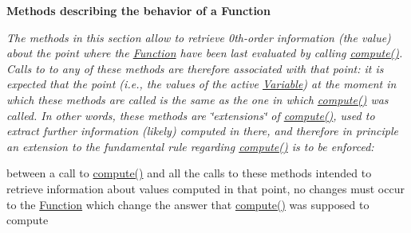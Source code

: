 \begin{Indent}\textbf{ Methods describing the behavior of a Function}\par
{\em The methods in this section allow to retrieve 0th-\/order information (the value) about the point where the \mbox{\hyperlink{class_s_m_spp__di__unipi__it_1_1_function}{Function}} have been last evaluated by calling \mbox{\hyperlink{class_s_m_spp__di__unipi__it_1_1_function_a504d4e3e174c7a518cc66156a8a45ce5}{compute()}}. Calls to to any of these methods are therefore associated with that point\+: it is expected that the point (i.\+e., the values of the active \mbox{\hyperlink{class_s_m_spp__di__unipi__it_1_1_variable}{Variable}}) at the moment in which these methods are called is the same as the one in which \mbox{\hyperlink{class_s_m_spp__di__unipi__it_1_1_function_a504d4e3e174c7a518cc66156a8a45ce5}{compute()}} was called. In other words, these methods are \char`\"{}extensions\char`\"{} of \mbox{\hyperlink{class_s_m_spp__di__unipi__it_1_1_function_a504d4e3e174c7a518cc66156a8a45ce5}{compute()}}, used to extract further information (likely) computed in there, and therefore in principle an extension to the fundamental rule regarding \mbox{\hyperlink{class_s_m_spp__di__unipi__it_1_1_function_a504d4e3e174c7a518cc66156a8a45ce5}{compute()}} is to be enforced\+:

between a call to \mbox{\hyperlink{class_s_m_spp__di__unipi__it_1_1_function_a504d4e3e174c7a518cc66156a8a45ce5}{compute()}} and all the calls to these methods intended to retrieve information about values computed in that point, no changes must occur to the \mbox{\hyperlink{class_s_m_spp__di__unipi__it_1_1_function}{Function}} which change the answer that \mbox{\hyperlink{class_s_m_spp__di__unipi__it_1_1_function_a504d4e3e174c7a518cc66156a8a45ce5}{compute()}} was supposed to compute

}
\end{Indent}
